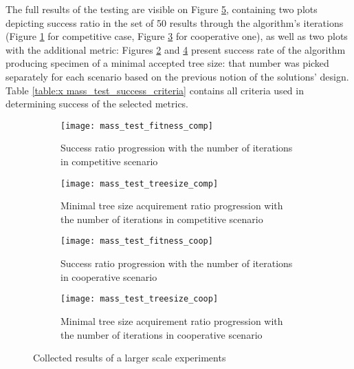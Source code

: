The full results of the testing are visible on Figure \ref{fig:x mass_test_plots}, containing two plots depicting success ratio in the set of 50 results through the algorithm's iterations (Figure \ref{fig: massfitnesscomp} for competitive case, Figure \ref{fig: massfitnesscoop} for cooperative one), as well as two plots with the additional metric: Figures \ref{fig: masstreesizecomp} and \ref{fig: masstreesizecoop} present success rate of the algorithm producing specimen of a minimal accepted tree size: that number was picked separately for each scenario based on the previous notion of the solutions' design. Table \ref{table:x mass_test_success_criteria} contains all criteria used in determining success of the selected metrics.
\begin{figure}[H]
    \centering
    \begin{subfigure}[b]{0.4\textwidth}
        \centering
        \texttt{[image: mass\_test\_fitness\_comp]}
        \caption{Success ratio progression with the number of iterations in competitive scenario}
        \label{fig: massfitnesscomp}
    \end{subfigure}
    \hfill
    \begin{subfigure}[b]{0.4\textwidth}
        \centering
        \texttt{[image: mass\_test\_treesize\_comp]}
        \caption{Minimal tree size acquirement ratio progression with the number of iterations in competitive scenario}
        \label{fig: masstreesizecomp}
    \end{subfigure}

    \begin{subfigure}[b]{0.4\textwidth}
        \centering
        \texttt{[image: mass\_test\_fitness\_coop]}
        \caption{Success ratio progression with the number of iterations in cooperative scenario}
        \label{fig: massfitnesscoop}
    \end{subfigure}
    \hfill
    \begin{subfigure}[b]{0.4\textwidth}
        \centering
        \texttt{[image: mass\_test\_treesize\_coop]}
        \caption{Minimal tree size acquirement ratio progression with the number of iterations in cooperative scenario}
        \label{fig: masstreesizecoop}
    \end{subfigure}
    \caption{Collected results of a larger scale experiments}
    \label{fig:x mass_test_plots}
\end{figure}

